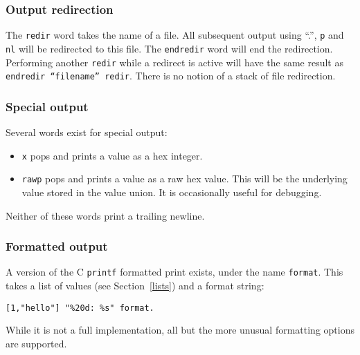 \subsubsection{Output redirection}
The \texttt{redir} word takes the name of a file. All subsequent output
using ``.'', \texttt{p} and \texttt{nl} will be redirected to this file.
The \texttt{endredir} word will end the redirection. Performing another
\texttt{redir} while a redirect is active will have the same result
as \texttt{endredir ``filename'' redir}. There is no notion of a
stack of file redirection.  

\subsubsection{Special output}
Several words exist for special output:
\begin{itemize}
\item \texttt{x} pops and prints a value as a hex integer.
\item \texttt{rawp} pops and prints a value as a raw hex value. This will
be the underlying value stored in the value union. It is occasionally useful for debugging.
\end{itemize}
Neither of these words print a trailing newline.

\subsubsection{Formatted output}
A version of the C \texttt{printf} formatted print exists, under the
name \texttt{format}.
This takes a list of values (see Section~\ref{lists}) and a format string:
\begin{lstlisting}
[1,"hello"] "%20d: %s" format.
\end{lstlisting}
While it is not a full implementation, all but the more unusual formatting
options are supported.


